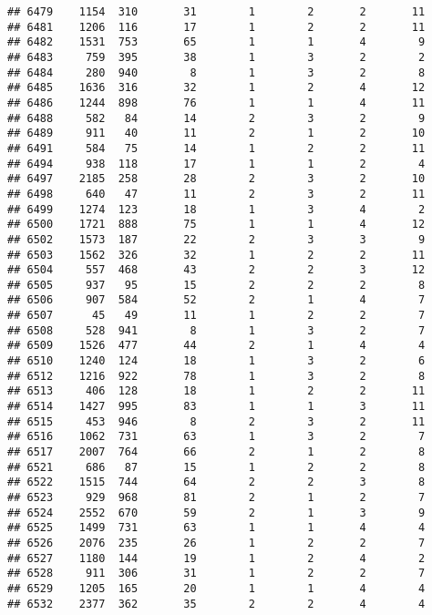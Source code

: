 \documentclass[]{article}
\begin{document}
\begin{verbatim}
## 6479    1154  310       31        1        2       2       11
## 6481    1206  116       17        1        2       2       11
## 6482    1531  753       65        1        1       4        9
## 6483     759  395       38        1        3       2        2
## 6484     280  940        8        1        3       2        8
## 6485    1636  316       32        1        2       4       12
## 6486    1244  898       76        1        1       4       11
## 6488     582   84       14        2        3       2        9
## 6489     911   40       11        2        1       2       10
## 6491     584   75       14        1        2       2       11
## 6494     938  118       17        1        1       2        4
## 6497    2185  258       28        2        3       2       10
## 6498     640   47       11        2        3       2       11
## 6499    1274  123       18        1        3       4        2
## 6500    1721  888       75        1        1       4       12
## 6502    1573  187       22        2        3       3        9
## 6503    1562  326       32        1        2       2       11
## 6504     557  468       43        2        2       3       12
## 6505     937   95       15        2        2       2        8
## 6506     907  584       52        2        1       4        7
## 6507      45   49       11        1        2       2        7
## 6508     528  941        8        1        3       2        7
## 6509    1526  477       44        2        1       4        4
## 6510    1240  124       18        1        3       2        6
## 6512    1216  922       78        1        3       2        8
## 6513     406  128       18        1        2       2       11
## 6514    1427  995       83        1        1       3       11
## 6515     453  946        8        2        3       2       11
## 6516    1062  731       63        1        3       2        7
## 6517    2007  764       66        2        1       2        8
## 6521     686   87       15        1        2       2        8
## 6522    1515  744       64        2        2       3        8
## 6523     929  968       81        2        1       2        7
## 6524    2552  670       59        2        1       3        9
## 6525    1499  731       63        1        1       4        4
## 6526    2076  235       26        1        2       2        7
## 6527    1180  144       19        1        2       4        2
## 6528     911  306       31        1        2       2        7
## 6529    1205  165       20        1        1       4        4
## 6532    2377  362       35        2        2       4        4

\end{verbatim}
\end{document}
